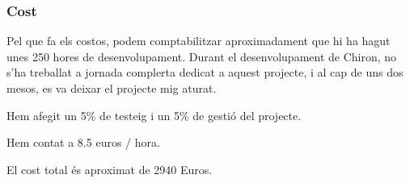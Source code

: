 \subsubsection{Cost} %
\label{ssub:Cost}

Pel que fa els costos, podem comptabilitzar aproximadament que hi ha
hagut unes 250 hores de desenvolupament.  Durant el desenvolupament de
Chiron, no s'ha treballat a jornada complerta dedicat a aquest
projecte, i al cap de uns dos mesos, es va deixar el projecte mig aturat.


Hem afegit un 5\% de testeig i un 5\% de gestió del projecte.

Hem contat a 8.5 euros / hora.

El cost total és aproximat de 2940 Euros.


%
